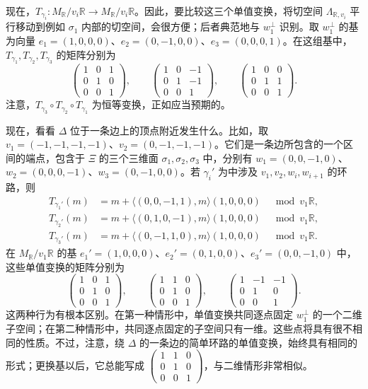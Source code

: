 \begin{example}
现在，$T_{\gamma_i}\colon M_{\mathbb R}/v_i\mathbb R\to M_{\mathbb R}/v_i\mathbb R$。因此，要比较这三个单值变换，将切空间 $\Lambda_{\mathbb R,v_i}$ 平行移动到例如 $\sigma_1$ 内部的切空间，会很方便；后者典范地与 $w_1^\perp$ 识别。取 $w_1^\perp$ 的基为向量 $e_1=(1,0,0,0)$、$e_2=(0,-1,0,0)$、$e_3=(0,0,0,1)$。在这组基中，$T_{\gamma_1},T_{\gamma_2},T_{\gamma_3}$ 的矩阵分别为
\[
\begin{pmatrix}1&0&1\\0&1&0\\0&0&1\end{pmatrix},\qquad
\begin{pmatrix}1&0&-1\\0&1&-1\\0&0&1\end{pmatrix},\qquad
\begin{pmatrix}1&0&0\\0&1&1\\0&0&1\end{pmatrix}.
\]
注意，$T_{\gamma_3}\circ T_{\gamma_2}\circ T_{\gamma_1}$ 为恒等变换，正如应当预期的。

现在，看看 $\Delta$ 位于一条边上的顶点附近发生什么。比如，取 $v_1=(-1,-1,-1,-1)$、$v_2=(0,-1,-1,-1)$。它们是一条边所包含的一个区间的端点，包含于 $\Xi$ 的三个三维面 $\sigma_1,\sigma_2,\sigma_3$ 中，分别有 $w_1=(0,0,-1,0)$、$w_2=(0,0,0,-1)$、$w_3=(0,-1,0,0)$。若 $\gamma_i'$ 为中涉及 $v_1,v_2,w_i,w_{i+1}$ 的环路，则
\[
\begin{aligned}
T_{\gamma_1'}(m)&=m+\langle(0,0,-1,1),m\rangle(1,0,0,0)
\quad\bmod v_1\mathbb R,\\
T_{\gamma_2'}(m)&=m+\langle(0,1,0,-1),m\rangle(1,0,0,0)
\quad\bmod v_1\mathbb R,\\
T_{\gamma_3'}(m)&=m+\langle(0,-1,1,0),m\rangle(1,0,0,0)
\quad\bmod v_1\mathbb R.
\end{aligned}
\]
在 $M_{\mathbb R}/v_1\mathbb R$ 的基 $e_1'=(1,0,0,0)$、$e_2'=(0,1,0,0)$、$e_3'=(0,0,-1,0)$ 中，这些单值变换的矩阵分别为
\[
\begin{pmatrix}1&0&1\\0&1&0\\0&0&1\end{pmatrix},\qquad
\begin{pmatrix}1&1&0\\0&1&0\\0&0&1\end{pmatrix},\qquad
\begin{pmatrix}1&-1&-1\\0&1&0\\0&0&1\end{pmatrix}.
\]
这两种行为有根本区别。在第一种情形中，单值变换共同逐点固定 $w_1^\perp$ 的一个二维子空间；在第二种情形中，共同逐点固定的子空间只有一维。这些点将具有很不相同的性质。不过，注意，绕 $\Delta$ 的一条边的简单环路的单值变换，始终具有相同的形式；更换基以后，它总能写成 $\begin{pmatrix}1&1&0\\0&1&0\\0&0&1\end{pmatrix}$，与二维情形非常相似。\BookQED
\end{example}


